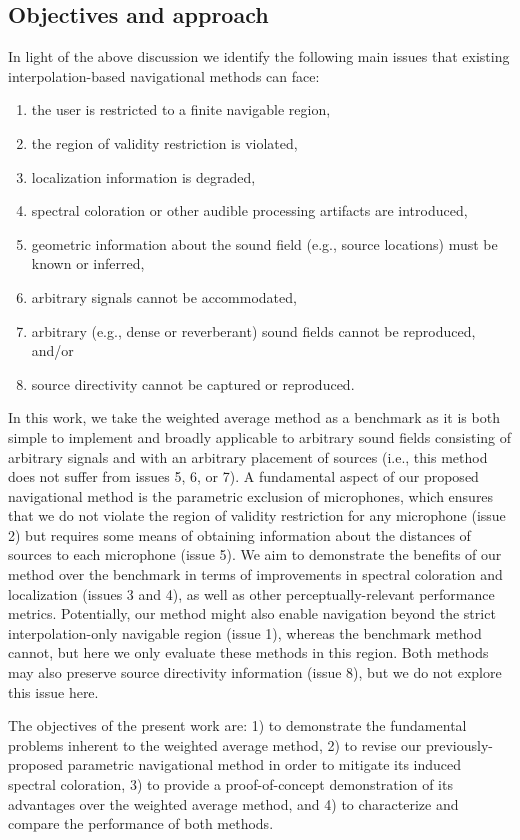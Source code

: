 \subsection{Objectives and approach}\label{sec:08_Proposed_Method:Objectives}
In light of the above discussion we identify the following main issues that existing interpolation-based navigational methods can face:
\begin{enumerate}
\item the user is restricted to a finite navigable region,
\item the region of validity restriction is violated,
\item localization information is degraded,
\item spectral coloration or other audible processing artifacts are introduced,
\item geometric information about the sound field (e.g., source locations) must be known or inferred,
\item arbitrary signals cannot be accommodated,
\item arbitrary (e.g., dense or reverberant) sound fields cannot be reproduced, and/or
\item source directivity cannot be captured or reproduced.
\end{enumerate}
In this work, we take the weighted average method as a benchmark as it is both simple to implement and broadly applicable to arbitrary sound fields consisting of arbitrary signals and with an arbitrary placement of sources (i.e., this method does not suffer from issues 5, 6, or 7).
A fundamental aspect of our proposed navigational method is the parametric exclusion of microphones, which ensures that we do not violate the region of validity restriction for any microphone (issue 2) but requires some means of obtaining information about the distances of sources to each microphone (issue 5).
We aim to demonstrate the benefits of our method over the benchmark in terms of improvements in spectral coloration and localization (issues 3 and 4), as well as other perceptually-relevant performance metrics.
Potentially, our method might also enable navigation beyond the strict interpolation-only navigable region (issue 1), whereas the benchmark method cannot, but here we only evaluate these methods in this region.
Both methods may also preserve source directivity information (issue 8), but we do not explore this issue here.

The objectives of the present work are: 1) to demonstrate the fundamental problems inherent to the weighted average method, 2) to revise our previously-proposed parametric navigational method in order to mitigate its induced spectral coloration, 3) to provide a proof-of-concept demonstration of its advantages over the weighted average method, and 4) to characterize and compare the performance of both methods.

